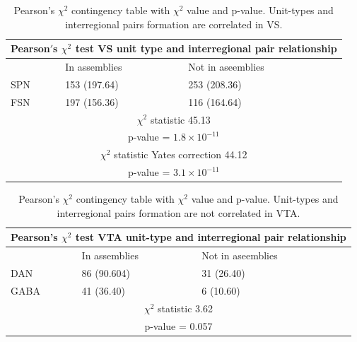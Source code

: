 \begin{table}[H]
\begin{tabular}{ |p{3cm}|p{3cm}|p{3cm}| }
 \hline
 \multicolumn{3}{|c|}{Pearson$'$s $\chi^2$ test VS unit type and interregional pair relationship} \\
 \hline
 & In assemblies & Not in aseemblies\\
 \hline
 SPN & 153 (197.64) & 253 (208.36) \\
 \hline
 FSN & 197 (156.36) & 116 (164.64)\\
 \hline
 \multicolumn{3}{|c|}{$\chi^2$ statistic  45.13}\\
 \multicolumn{3}{|c|}{p-value = $1.8\times10^{-11}$}\\
 \hline
 \multicolumn{3}{|c|}{$\chi^2$ statistic Yates correction 44.12}\\
 \multicolumn{3}{|c|}{p-value = $3.1\times10^{-11}$}\\
 \hline
\end{tabular}
\caption{Pearson's $\chi^2$ contingency table with $\chi^2$ value and p-value. Unit-types and interregional pairs formation are correlated in VS.}
\label{tab:chi2_asnotasVS}
\end{table}
\begin{table}[H]
\begin{tabular}{ |p{3cm}|p{3cm}|p{3cm}| }
 \hline
 \multicolumn{3}{|c|}{Pearson's $\chi^2$ test VTA unit-type and interregional pair relationship} \\
 \hline
 & In assemblies & Not in aseemblies\\
 \hline
 DAN & 86 (90.604) & 31 (26.40) \\
 \hline
 GABA & 41 (36.40) & 6 (10.60)\\
 \hline
 \multicolumn{3}{|c|}{$\chi^2$ statistic  3.62}\\
 \multicolumn{3}{|c|}{p-value = 0.057}\\
 \hline
\end{tabular}
\caption{Pearson's $\chi^2$ contingency table with $\chi^2$ value and p-value. Unit-types and interregional pairs formation are not correlated in VTA.}
\label{tab:chi2_asnotasVTA}
\end{table}
